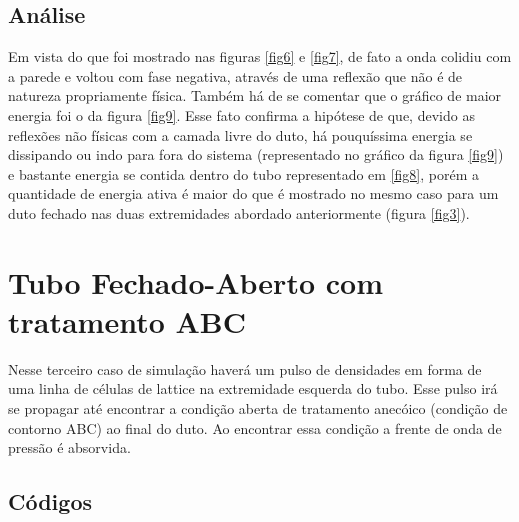 \subsection{Análise}

Em vista do que foi mostrado nas figuras \ref{fig6} e \ref{fig7}, de fato a onda colidiu com a parede e voltou com fase negativa, através de uma reflexão que não é de natureza propriamente física. Também há de se comentar que o gráfico de maior energia foi o da figura \ref{fig9}. Esse fato confirma a hipótese de que, devido as reflexões não físicas com a camada livre do duto, há pouquíssima energia se dissipando ou indo para fora do sistema (representado no gráfico da figura \ref{fig9}) e bastante energia se contida dentro do tubo representado em \ref{fig8}, porém a quantidade de energia ativa é maior do que é mostrado no mesmo caso para um duto fechado nas duas extremidades abordado anteriormente (figura \ref{fig3}).

\newpage
\section{Tubo Fechado-Aberto com tratamento ABC}

Nesse terceiro caso de simulação haverá um pulso de densidades em forma de uma linha de células de lattice na extremidade esquerda do tubo. Esse pulso irá se propagar até encontrar a condição aberta de tratamento anecóico (condição de contorno ABC) ao final do duto. Ao encontrar essa condição a frente de onda de pressão é absorvida.

\subsection{Códigos}



